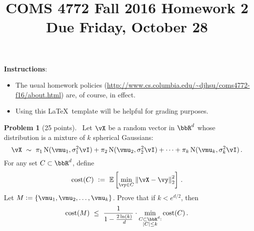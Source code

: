 \documentclass[11pt]{article}
\title{COMS 4772 Fall 2016 Homework 2 \\ Due Friday, October 28}
\author{%
  }
\date{%
  }
\newcommand{\E}{\ensuremath{\mathbb{E}}} %
\newcommand{\Normal}{\ensuremath{\operatorname{N}}} %
\newcommand{\cost}{\ensuremath{\operatorname{cost}}} %
\theoremstyle{definition}
\newtheorem{problem}{Problem}
\begin{document}
\maketitle

\noindent\textbf{Instructions}:
\begin{itemize}
  \item
    The usual homework policies (\url{http://www.cs.columbia.edu/~djhsu/coms4772-f16/about.html}) are, of course, in effect.

  \item
    Using this \LaTeX\ template will be helpful for grading purposes.

\end{itemize}

\newpage


\begin{problem}[25 points] \
  Let $\vX$ be a random vector in $\bbR^d$ whose distribution is a mixture of
  $k$ spherical Gaussians:
  \begin{equation*}
    \vX \ \sim \
    \pi_1 \Normal(\vmu_1,\sigma_1^2\vI) + \pi_2 \Normal(\vmu_2,\sigma_2^2\vI) + \dotsb + \pi_k \Normal(\vmu_k,\sigma_k^2\vI)
    \,.
  \end{equation*}
  For any set $C \subset \bbR^d$, define
  \begin{equation*}
    \cost(C) \ := \ \E\sbr{ \min_{\vy \in C} \, \norm{\vX - \vy}_2^2 }
    \,.
  \end{equation*}
  Let $M := \cbr{ \vmu_1, \vmu_2, \dotsc, \vmu_k }$.
  Prove that if $k < e^{d/2}$, then
  \begin{equation*}
    \cost(M) \ \leq \
    \frac1{1 - \frac{2\ln(k)}{d}}
    \cdot
    \min_{\substack{C \subset \bbR^d : \\ |C| \leq k}} \cost(C)
    \,.
  \end{equation*}
\end{problem}
\end{document}
